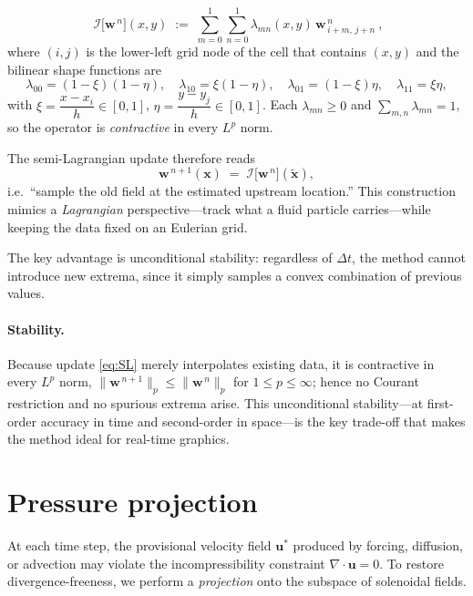\documentclass[11pt]{article}
\begin{document}
\[
  \;
  \mathcal{I}\!\bigl[\bm{w}^{\,n}\bigr](x,y)
  \;:=\;
  \sum_{m=0}^{1}\sum_{n=0}^{1}
     \lambda_{mn}(x,y)\,
     \bm{w}^{\,n}_{\,i+m,\,j+n}\ ,
\]
where \((i,j)\) is the lower-left grid node of the cell that contains
\((x,y)\) and the bilinear shape functions are
\[
  \lambda_{00} = (1-\xi)(1-\eta),
  \quad
  \lambda_{10} = \xi(1-\eta),
  \quad
  \lambda_{01} = (1-\xi)\eta,
  \quad
  \lambda_{11} = \xi\eta,
\]
with
$\xi = \dfrac{x - x_i}{h}\in[0,1]$,
$\eta = \dfrac{y - y_j}{h}\in[0,1]$.
Each $\lambda_{mn}\ge 0$ and
$\sum_{m,n}\lambda_{mn}=1$, so the operator is
\emph{contractive} in every $L^{p}$ norm.

The semi-Lagrangian update therefore reads
\begin{equation}\label{eq:SL}
  \bm{w}^{\,n+1}(\bm{x})
  \;=\;
  \mathcal{I}\!\bigl[\bm{w}^{\,n}\bigr](\tilde{\bm{x}}),
\end{equation}
i.e.\ “sample the old field at the estimated upstream location.” This construction mimics a \emph{Lagrangian} perspective—track what a
fluid particle carries—while keeping the data fixed on an Eulerian
grid. 

The key advantage is unconditional stability: regardless of
$\Delta t$, the method cannot introduce new extrema, since it simply
samples a convex combination of previous values.

\paragraph{Stability.}
Because update \eqref{eq:SL} merely interpolates existing data,
it is contractive in every $L^{p}$ norm,
\(
   \|\bm w^{\,n+1}\|_{p}\!\le\!\|\bm w^{\,n}\|_{p}
\)
for $1\!\le\!p\!\le\!\infty$;
hence no Courant restriction and no spurious extrema arise.
This unconditional stability—at first-order accuracy in time and
second-order in space—is the key trade-off that makes the method
ideal for real-time graphics.








\section{Pressure projection}
\label{sec:projection}

At each time step, the provisional velocity field
$\bm{u}^{\!*}$ produced by forcing, diffusion, or advection may violate
the incompressibility constraint $\nabla \cdot \bm{u} = 0$.  
To restore divergence-freeness, we perform a \emph{projection} onto the
subspace of solenoidal fields.
\end{document}
